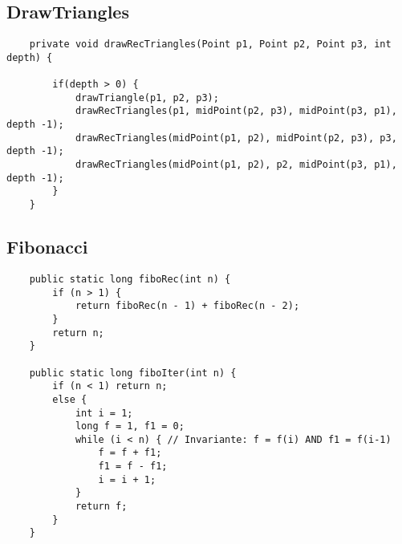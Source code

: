 \subsection*{DrawTriangles}

\begin{verbatim}    
    private void drawRecTriangles(Point p1, Point p2, Point p3, int depth) {
    
    	if(depth > 0) {
    		drawTriangle(p1, p2, p3);
    		drawRecTriangles(p1, midPoint(p2, p3), midPoint(p3, p1), depth -1);
    		drawRecTriangles(midPoint(p1, p2), midPoint(p2, p3), p3, depth -1);
    		drawRecTriangles(midPoint(p1, p2), p2, midPoint(p3, p1), depth -1);
    	}
    }
\end{verbatim}

\subsection*{Fibonacci}

\begin{verbatim} 
    public static long fiboRec(int n) {
        if (n > 1) {
            return fiboRec(n - 1) + fiboRec(n - 2);
        }
        return n;
    }

    public static long fiboIter(int n) {
        if (n < 1) return n;
        else {
            int i = 1;
            long f = 1, f1 = 0; 
            while (i < n) { // Invariante: f = f(i) AND f1 = f(i-1)
                f = f + f1;
                f1 = f - f1;
                i = i + 1;
            }
            return f;
        }
    }
\end{verbatim}